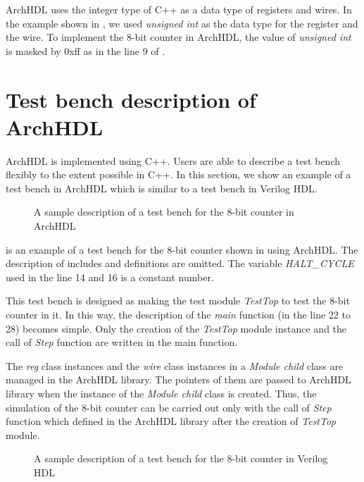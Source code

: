 ArchHDL uses the integer type of C++ as a data type of registers and wires.
In the example shown in , we used \textit{unsigned int} as the data type for the register and the wire.
To implement the 8-bit counter in ArchHDL, the value of \textit{unsigned int} is masked by 0xff as in the line 9 of .


\section{Test bench description of ArchHDL}

ArchHDL is implemented using C++.
Users are able to describe a test bench flexibly to the extent possible in C++.
In this section, we show an example of a test bench in ArchHDL which is similar to a test bench in Verilog HDL.

\begin{figure}[t]
 
 \caption{A sample description of a test bench for the 8-bit counter in ArchHDL}
 \label{src:test}
\end{figure}

 is an example of a test bench for the 8-bit counter shown in  using ArchHDL.
The description of includes and definitions are omitted.
The variable \textit{HALT\_CYCLE} used in the line 14 and 16 is a constant number.

This test bench is designed as making the test module \textit{TestTop} to test the 8-bit counter in it.
In this way, the description of the \textit{main} function (in the line 22 to 28) becomes simple.
Only the creation of the \textit{TestTop} module instance and the call of \textit{Step} function are written in the main function.

The \textit{reg} class instances and the \textit{wire} class instances in a \textit{Module child} class are managed in the ArchHDL library.
The pointers of them are passed to ArchHDL library when the instance of the \textit{Module child} class is created.
Thus, the simulation of the 8-bit counter can be carried out only with the call of \textit{Step} function which defined in the ArchHDL library after the creation of \textit{TestTop} module.

\begin{figure}[t]
 
 \caption{A sample description of a test bench for the 8-bit counter in Verilog HDL}
 \label{src:test_v}
\end{figure}

